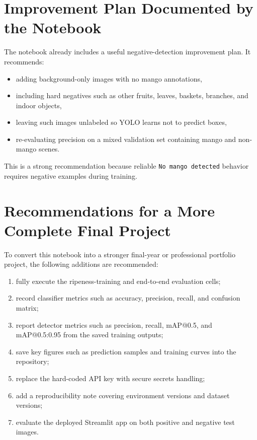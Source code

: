 \documentclass[12pt,a4paper]{article}
\begin{document}
\section{Improvement Plan Documented by the Notebook}
The notebook already includes a useful negative-detection improvement plan. It recommends:
\begin{itemize}
    \item adding background-only images with no mango annotations,
    \item including hard negatives such as other fruits, leaves, baskets, branches, and indoor objects,
    \item leaving such images unlabeled so YOLO learns not to predict boxes,
    \item re-evaluating precision on a mixed validation set containing mango and non-mango scenes.
\end{itemize}

This is a strong recommendation because reliable \texttt{No mango detected} behavior requires negative examples during training.

\section{Recommendations for a More Complete Final Project}
To convert this notebook into a stronger final-year or professional portfolio project, the following additions are recommended:
\begin{enumerate}
    \item fully execute the ripeness-training and end-to-end evaluation cells;
    \item record classifier metrics such as accuracy, precision, recall, and confusion matrix;
    \item report detector metrics such as precision, recall, mAP@0.5, and mAP@0.5:0.95 from the saved training outputs;
    \item save key figures such as prediction samples and training curves into the repository;
    \item replace the hard-coded API key with secure secrets handling;
    \item add a reproducibility note covering environment versions and dataset versions;
    \item evaluate the deployed Streamlit app on both positive and negative test images.
\end{enumerate}
\end{document}
